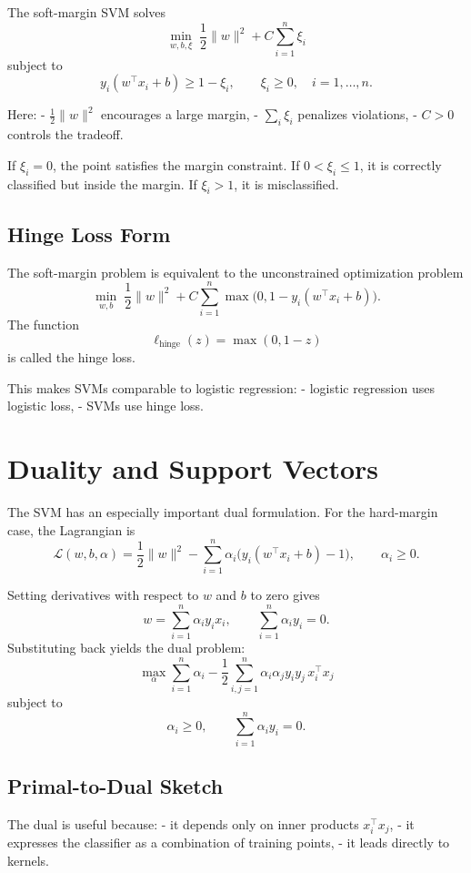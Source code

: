 \begin{definition}
The soft-margin SVM solves
\[
\min_{w,b,\xi}\;
\frac12\|w\|^2 + C\sum_{i=1}^n \xi_i
\]
subject to
\[
y_i(w^\top x_i+b)\ge 1-\xi_i,\qquad \xi_i\ge 0,\quad i=1,\dots,n.
\]
\end{definition}

Here:
- $\frac12\|w\|^2$ encourages a large margin,
- $\sum_i \xi_i$ penalizes violations,
- $C>0$ controls the tradeoff.

If $\xi_i=0$, the point satisfies the margin constraint.  
If $0<\xi_i\le 1$, it is correctly classified but inside the margin.  
If $\xi_i>1$, it is misclassified.

\subsection{Hinge Loss Form}

The soft-margin problem is equivalent to the unconstrained optimization problem
\[
\min_{w,b}\;
\frac12\|w\|^2
+
C\sum_{i=1}^n \max\bigl(0,1-y_i(w^\top x_i+b)\bigr).
\]
The function
\[
\ell_{\mathrm{hinge}}(z)=\max(0,1-z)
\]
is called the hinge loss.

This makes SVMs comparable to logistic regression:
- logistic regression uses logistic loss,
- SVMs use hinge loss.

\section{Duality and Support Vectors}

The SVM has an especially important dual formulation. For the hard-margin case, the Lagrangian is
\[
\mathcal L(w,b,\alpha)
=
\frac12\|w\|^2
-
\sum_{i=1}^n \alpha_i\bigl(y_i(w^\top x_i+b)-1\bigr),
\qquad \alpha_i\ge 0.
\]

Setting derivatives with respect to $w$ and $b$ to zero gives
\[
w=\sum_{i=1}^n \alpha_i y_i x_i,
\qquad
\sum_{i=1}^n \alpha_i y_i=0.
\]
Substituting back yields the dual problem:
\[
\max_{\alpha}
\sum_{i=1}^n \alpha_i
-
\frac12\sum_{i,j=1}^n \alpha_i\alpha_j y_i y_j\, x_i^\top x_j
\]
subject to
\[
\alpha_i\ge 0,
\qquad
\sum_{i=1}^n \alpha_i y_i=0.
\]

\subsection{Primal-to-Dual Sketch}

The dual is useful because:
- it depends only on inner products $x_i^\top x_j$,
- it expresses the classifier as a combination of training points,
- it leads directly to kernels.

